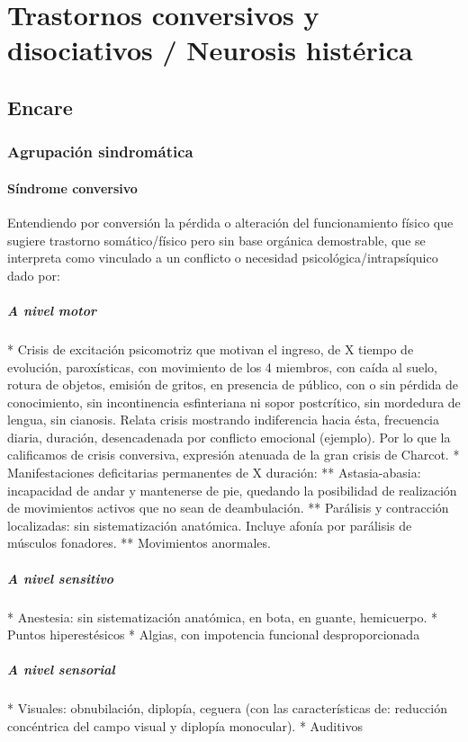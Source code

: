 \chapter{Trastornos conversivos y disociativos / Neurosis histérica}
\section*{Encare}
\subsection*{Agrupación sindromática}
\subsubsection*{Síndrome conversivo}
Entendiendo por conversión la pérdida o alteración del funcionamiento físico que sugiere trastorno somático/físico pero sin base orgánica demostrable, que se interpreta como vinculado a un conflicto o necesidad psicológica/intrapsíquico dado por:
\paragraph{A nivel motor}
* Crisis de excitación psicomotriz que motivan el ingreso, de X tiempo de evolución, paroxísticas, con movimiento de los 4 miembros, con caída al suelo, rotura de objetos, emisión de gritos, en presencia de público, con o sin pérdida de conocimiento, sin incontinencia esfinteriana ni sopor postcrítico, sin mordedura de lengua, sin cianosis. Relata crisis mostrando indiferencia hacia ésta, frecuencia diaria, duración, desencadenada por conflicto emocional (ejemplo). Por lo que la calificamos de crisis conversiva, expresión atenuada de la gran crisis de Charcot.
* Manifestaciones deficitarias permanentes de X duración:
** Astasia-abasia: incapacidad de andar y mantenerse de pie, quedando la posibilidad de realización de movimientos activos que no sean de deambulación.
** Parálisis y contracción localizadas: sin sistematización anatómica. Incluye afonía por parálisis de músculos fonadores.
** Movimientos anormales.
\paragraph{A nivel sensitivo}
* Anestesia: sin sistematización anatómica, en bota, en guante, hemicuerpo.
* Puntos hiperestésicos
* Algias, con impotencia funcional desproporcionada
\paragraph{A nivel sensorial}
* Visuales: obnubilación, diplopía, ceguera (con las características de: reducción concéntrica del campo visual y diplopía monocular).
* Auditivos
